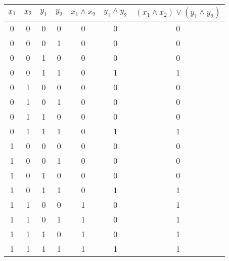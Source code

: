 \documentclass[a4paper]{article}
\begin{document}
\begin{center}
 
\begin{tabular}{|c|c|c|c|c|c|c|}
\hline
$x_1$ & $x_2$ & $y_1$ & $y_2$ & $x_1 \wedge x_2 $ & $y_1 \wedge y_2$ & $(x_1 \wedge x_2) \vee (y_1 \wedge y_2)$ \\
\hline
0 & 0 & 0 & 0 & 0 & 0 & 0 \\
0 & 0 & 0 & 1 & 0 & 0 & 0 \\
0 & 0 & 1 & 0 & 0 & 0 & 0 \\
0 & 0 & 1 & 1 & 0 & 1 & 1 \\
0 & 1 & 0 & 0 & 0 & 0 & 0 \\
0 & 1 & 0 & 1 & 0 & 0 & 0 \\
0 & 1 & 1 & 0 & 0 & 0 & 0 \\
0 & 1 & 1 & 1 & 0 & 1 & 1 \\
1 & 0 & 0 & 0 & 0 & 0 & 0 \\
1 & 0 & 0 & 1 & 0 & 0 & 0 \\
1 & 0 & 1 & 0 & 0 & 0 & 0 \\
1 & 0 & 1 & 1 & 0 & 1 & 1 \\
1 & 1 & 0 & 0 & 1 & 0 & 1 \\
1 & 1 & 0 & 1 & 1 & 0 & 1 \\
1 & 1 & 1 & 0 & 1 & 0 & 1 \\
1 & 1 & 1 & 1 & 1 & 1 & 1 \\

\hline
\end{tabular}

\end{center}
\end{document}
